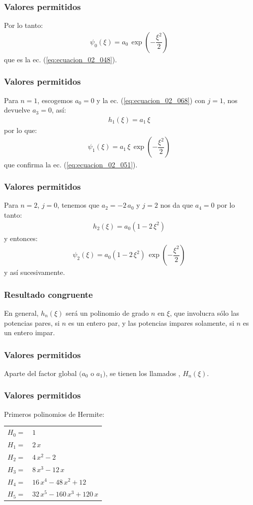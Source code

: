 \documentclass[12pt]{beamer}
\begin{document}
\begin{frame}
\frametitle{Valores permitidos}
Por lo tanto:
\pause
\begin{align*}
\psi_{0} (\xi) = a_{0} \, \exp \left( - \dfrac{\xi^{2}}{2} \right)
\end{align*}
que es la ec. (\ref{eq:ecuacion_02_048}).
\end{frame}
\begin{frame}
\frametitle{Valores permitidos}
Para $n=1$, \pause escogemos $a_{0} = 0$ y la ec. (\ref{eq:ecuacion_02_068}) con $j = 1$, nos devuelve $a_{3} = 0$, así:
\pause
\begin{align*}
h_{1} (\xi) = a_{1} \, \xi
\end{align*}
\pause
por lo que:
\pause
\begin{align*}
\psi_{1} (\xi) = a_{1} \, \xi \, \exp \left( - \dfrac{\xi^{2}}{2} \right)
\end{align*}
que confirma la ec. (\ref{eq:ecuacion_02_051}).
\end{frame}
\begin{frame}
\frametitle{Valores permitidos}
Para $n = 2$, \pause $j = 0$, tenemos que $a_{2} = - 2 \, a_{0}$ y $j = 2$ nos da que $a_{4} = 0$ por lo tanto:
\pause
\begin{align*}
h_{2} (\xi) = a_{0} (1 - 2 \, \xi^{2})
\end{align*}
\pause
y entonces:
\pause
\begin{align*}
\psi_{2} (\xi) = a_{0} (1 - 2 \, \xi^{2}) \, \exp \left( - \dfrac{\xi^{2}}{2} \right)
\end{align*}
y así sucesivamente.
\end{frame}
\begin{frame}
\frametitle{Resultado congruente}
En general, $h_{n} (\xi)$ será un polinomio de grado $n$ en $\xi$, que involucra sólo las potencias pares, si $n$ es un entero par, y las potencias impares solamente, si $n$ es un entero impar.
\end{frame}
\begin{frame}
\frametitle{Valores permitidos}
Aparte del factor global $(a_{0}$ o $a_{1})$, se tienen los llamados , $H_{n} (\xi)$.
\end{frame}
\begin{frame}
\frametitle{Valores permitidos}
Primeros polinomios de Hermite:
\pause
\begin{table}[H]
\renewcommand{\arraystretch}{0.8}
\centering
\begin{tabular}{l l}
$H_{0} =$ & $1$ \\
$H_{1} =$ & $2 \, x$ \\
$H_{2} =$ & $4 \, x^{2} - 2 $ \\
$H_{3} =$ & $8 \, x^{3} - 12 \, x$ \\
$H_{4} =$ & $16 \, x^{4} - 48 \, x^{2} + 12 $ \\
$H_{5} =$ & $32 \, x^{5} - 160 \, x^{3} + 120 \, x $
\end{tabular}
\end{table}
\end{frame}
\end{document}
